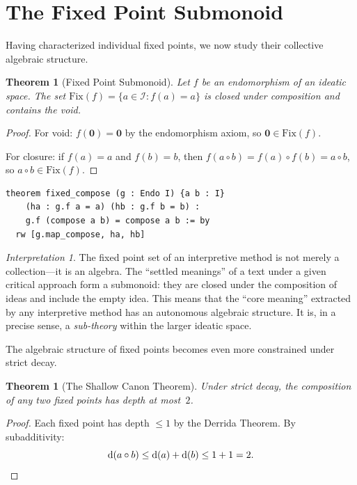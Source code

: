 \documentclass[11pt,openany]{book}
\theoremstyle{definition}
\theoremstyle{plain}
\newtheorem{theorem}[axiom]{Theorem}
\theoremstyle{remark}
\newtheorem{interpretation}[axiom]{Interpretation}
\newcommand{\IS}{\mathcal{I}}               %
\newcommand{\compose}{\circ}                 %
\newcommand{\void}{\mathbf{0}}              %
\newcommand{\depth}{\operatorname{d}}       %
\begin{document}
\section{The Fixed Point Submonoid}

Having characterized individual fixed points, we now study their collective algebraic structure.

\begin{theorem}[Fixed Point Submonoid]
\label{thm:fixed-submonoid}
Let $f$ be an endomorphism of an ideatic space. The set $\mathrm{Fix}(f) = \{a \in \IS : f(a) = a\}$ is closed under composition and contains the void.
\end{theorem}

\begin{proof}
For void: $f(\void) = \void$ by the endomorphism axiom, so $\void \in \mathrm{Fix}(f)$.

For closure: if $f(a) = a$ and $f(b) = b$, then $f(a \compose b) = f(a) \compose f(b) = a \compose b$, so $a \compose b \in \mathrm{Fix}(f)$.
\end{proof}

\begin{lstlisting}[language=Lean4]
theorem fixed_compose (g : Endo I) {a b : I}
    (ha : g.f a = a) (hb : g.f b = b) :
    g.f (compose a b) = compose a b := by
  rw [g.map_compose, ha, hb]
\end{lstlisting}

\begin{interpretation}
The fixed point set of an interpretive method is not merely a collection---it is an algebra. The ``settled meanings'' of a text under a given critical approach form a submonoid: they are closed under the composition of ideas and include the empty idea. This means that the ``core meaning'' extracted by any interpretive method has an autonomous algebraic structure. It is, in a precise sense, a \emph{sub-theory} within the larger ideatic space.
\end{interpretation}

The algebraic structure of fixed points becomes even more constrained under strict decay.

\begin{theorem}[The Shallow Canon Theorem]
\label{thm:shallow-canon}
Under strict decay, the composition of any two fixed points has depth at most~$2$.
\end{theorem}

\begin{proof}
Each fixed point has depth $\leq 1$ by the Derrida Theorem. By subadditivity:
\[
\depth(a \compose b) \leq \depth(a) + \depth(b) \leq 1 + 1 = 2. \qedhere
\]
\end{proof}
\end{document}
